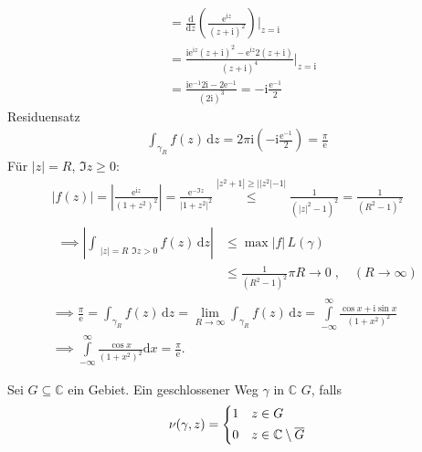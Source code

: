 \begin{example}
\begin{enum-arab}
\begin{align*}
      &= \frac{\mathrm{d}}{\mathrm{d}z} \left( \frac{\mathrm{e}^{\mathrm{i}z}}{(z + \mathrm{i})^2} \right) \bigg|_{z = \mathrm{i}} \\
      &= \frac{\mathrm{i} \mathrm{e}^{\mathrm{i}z} (z+\mathrm{i})^2 - \mathrm{e}^{\mathrm{i}z} 2 (z+\mathrm{i})}{(z+\mathrm{i})^4}  \bigg|_{z = \mathrm{i}} \\
      &= \frac{\mathrm{i} \mathrm{e}^{-1} 2 \mathrm{i} - 2 \mathrm{e}^{-1}}{(2\mathrm{i})^3} = - \mathrm{i} \frac{\mathrm{e}^{-1}}{2}
    \end{align*}
    Residuensatz
    \begin{align*}
      \int_{\gamma_R} f(z) \, \mathrm{d}z = 2 \pi \mathrm{i} \left( - \mathrm{i} \frac{\mathrm{e}^{-1}}{2} \right) = \frac{\pi}{\mathrm{e}}
    \end{align*}
    Für $|z| = R$, $\Im z \geq 0$:
    \begin{gather*}
      |f(z)| = \left| \frac{\mathrm{e}^{\mathrm{i}z}}{(1+z^2)^2} \right| = \frac{\mathrm{e}^{-\Im z}}{|1+z^2|^2} \overset{|z^2+1|\geq||z^2|-1|}{\leq} \frac{1}{(|z|^2 - 1)^2} = \frac{1}{(R^2 - 1)^2} \\
      \begin{aligned}
        \implies \left| \int_{\substack{|z|=R}{\Im z > 0}} f(z) \, \mathrm{d}z \right|
        &\leq \max |f| \, L(\gamma) \\
        &\leq \frac{1}{(R^2 - 1)^2} \pi R \to 0 \; , \quad (R \to \infty)
      \end{aligned} \\
      \implies \frac{\pi}{\mathrm{e}} = \int_{\gamma_R} f(z) \, \mathrm{d}z = \lim\limits_{R \to \infty} \int_{\gamma_R} f(z) \, \mathrm{d}z = \int\limits_{-\infty}^{\infty} \frac{\cos x + \mathrm{i} \sin x}{(1+x^2)^2} \\
      \implies \int\limits_{-\infty}^{\infty} \frac{\cos x}{(1+x^2)^2} \mathrm{d}x = \frac{\pi}{\mathrm{e}} .
    \end{gather*}
  \end{enum-arab}
\end{example}

\begin{theorem}[Definition] \label{thm:4.19}
  Sei $G \subseteq \mathbb{C}$ ein Gebiet. Ein geschlossener Weg $\gamma$ in $\mathbb{C}$  $G$, falls
  \begin{align*}
    \nu(\gamma,z) = 
    \begin{dcases}
      1 & z \in G \\
      0 & z \in \mathbb{C}\setminus \overline{G}
    \end{dcases}
  \end{align*}
\end{theorem}

